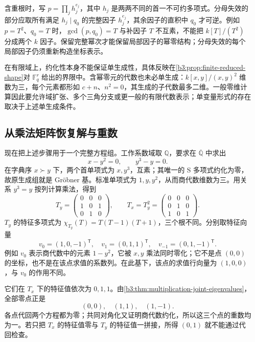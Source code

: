 \ProseParagraphBreak
含重根时，写 \(p=\prod_j h_j^{e_j}\)，其中 \(h_j\) 是两两不同的首一不可约多项式。分母失效的部分应取所有满足 \(h_j\mid q_0\) 的完整因子 \(h_j^{e_j}\)，其余因子的直积中 \(q_0\) 才可逆。例如 \(p=T^2\)、\(q_0=T\) 时，\(\gcd(p,q_0)=T\) 与补因子 \(T\) 不互素，不能把 \(k[T]/(T^2)\) 分成两个 \(k\) 因子。保留完整幂次才能保留局部因子的幂零结构；分母失效的每个局部因子仍须重新构造坐标表示。

\ProseParagraphBreak
在有限域上，约化性本身不能保证单生成性，具体反映在\cref{b3:prop:finite-reduced-shape}对 \(\mathbb F_q^r\) 给出的界限中。含幂零元的代数也未必单生成：\(k[x,y]/(x,y)^2\) 维数为三，每个元素都形如 \(c+n\)、\(n^2=0\)，其生成的子代数最多二维。一般零维计算因此要允许域扩张、多个三角分支或更一般的有限代数表示；单变量形式的存在取决于上述单生成条件。

\subsection{从乘法矩阵恢复解与重数}
\label{b3:subsec:0805:05}

现在把上述步骤用于一个完整方程组。工作系数域取 \(\mathbb Q\)，要求在 \(\overline{\mathbb Q}\) 中求出
\[
	x-y^2=0,\qquad y^3-y=0.
\]
在字典序 \(x\succ y\) 下，两个首单项式为 \(x,y^3\)，互素；其唯一的 S 多项式约化为零，故原生成组就是 Gröbner 基。标准单项式为 \(1,y,y^2\)，从而商代数维数为三。用关系 \(y^3=y\) 按列计算乘法，得到
\[
	T_y=\begin{pmatrix}0&0&0\\1&0&1\\0&1&0\end{pmatrix},
	\qquad
	T_x=T_y^2=\begin{pmatrix}0&0&0\\0&1&0\\1&0&1\end{pmatrix}.
\]
\(T_y\) 的特征多项式为 \(\chi_{T_y}(T)=T(T-1)(T+1)\)，三个根不同。分别取特征向量
\[
	v_0=(1,0,-1)^{\mathsf T},\quad v_1=(0,1,1)^{\mathsf T},\quad v_{-1}=(0,1,-1)^{\mathsf T}.
\]
例如 \(v_0\) 表示商代数中的元素 \(1-y^2\)，它被 \(x,y\) 乘法同时零化；它不是点 \((0,0)\) 的坐标，也不是在该点求值的系数列。在此基下，该点的求值行向量为 \((1,0,0)\)，与 \(v_0\) 的作用不同。

\ProseParagraphBreak
它们在 \(T_x\) 下的特征值依次为 \(0,1,1\)。由\cref{b3:thm:multiplication-joint-eigenvalues}，全部零点正是
\[
	(0,0),\quad(1,1),\quad(1,-1).
\]
各点代回两个方程都为零；共同对角化又证明商代数约化，所以这三个点的重数均为一。若只把 \(T_x\) 的特征值零与 \(T_y\) 的特征值一拼接，所得 \((0,1)\) 就不能通过代回检查。

